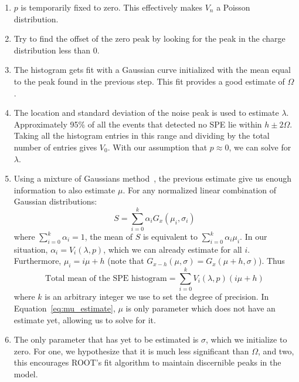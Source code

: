 \documentclass[12pt,openright,twoside]{report}
\begin{document}
\begin{enumerate}
    \item $p$ is temporarily fixed to zero. This effectively makes $V_n$ a
    Poisson distribution.
    
    \item Try to find the offset of the zero peak by looking for the peak in
    the charge distribution less than 0.

    \item\label{sp:fit_gaus} The histogram gets fit with a Gaussian curve
    initialized with the mean equal to the peak found in the previous step.
    This fit provides a good estimate of $\Omega$.
    
    \item The location and standard deviation of the noise peak is used to
    estimate $\lambda$. Approximately 95\% of all the events that detected no
    SPE lie within $h \pm 2 \Omega$. Taking all the histogram entries in this
    range and dividing by the total number of entries gives $V_0$. With our
    assumption that $p \approx 0$, we can solve for $\lambda$.
    
    \item Using a mixture of Gaussians method~\cite{gaus_mix}, the previous
    estimate give us enough information to also estimate $\mu$. For any
    normalized linear combination of Gaussian distributions:
    \begin{equation}
        S = \sum_{i=0}^k \alpha_i G_x(\mu_i, \sigma_i)
    \end{equation}
    where $\sum_{i=0}^k \alpha_i = 1$, the mean of $S$ is equivalent to
    $\sum_{i=0}^k \alpha_i \mu_i$. In our situation, $\alpha_i = V_i(\lambda,
    p)$, which we can already estimate for all $i$. Furthermore, $\mu_i = i\mu
    + h$ (note that $G_{x-h}(\mu, \sigma) = G_x(\mu+h, \sigma)$). Thus
    \begin{equation}\label{eq:mu_estimate}
        \text{Total mean of the SPE histogram} = \sum_{i=0}^k V_i(\lambda, p)(i\mu + h)
    \end{equation}
    where $k$ is an arbitrary integer we use to set the degree of precision. In
    Equation~\ref{eq:mu_estimate}, $\mu$ is only parameter which does not have
    an estimate yet, allowing us to solve for it.
    
    \item The only parameter that has yet to be estimated is $\sigma$, which we
    initialize to zero. For one, we hypothesize that it is much less
    significant than $\Omega$, and two, this encourages ROOT's fit algorithm to
    maintain discernible peaks in the model.
\end{enumerate}
\end{document}
